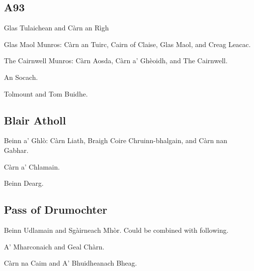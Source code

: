 \subsection{A93}

\begin{munros}
\item Glas Tulaichean and Càrn an Rìgh

\item
Glas Maol Munros: Càrn an Tuirc, Cairn of Claise, Glas Maol, and Creag Leacac.

\item The Cairnwell Munros: Càrn Aosda, Càrn a' Ghèoidh, and The Cairnwell.

\item An Socach.

\item Tolmount and Tom Buidhe.
\end{munros}



\subsection{Blair Atholl}

\begin{munros}
\item Beinn a' Ghlò: Càrn Liath, Braigh Coire Chruinn-bhalgain, and Càrn nan
  Gabhar.

\item Càrn a' Chlamain.

\item Beinn Dearg. \tick
\end{munros}


\subsection{Pass of Drumochter}

\begin{munros}
\item
Beinn Udlamain and Sgàirneach Mhòr.  Could be combined with following.  \tick

\item
A' Mharconaich and Geal Chàrn. \tick

\item Càrn na Caim and A' Bhuidheanach Bheag. \tick
\end{munros}


